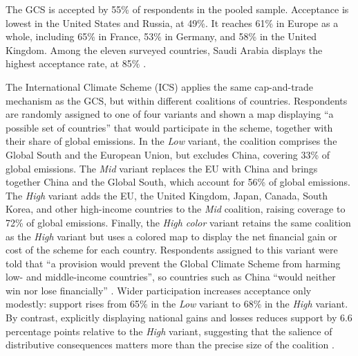 \documentclass[11pt,a4paper]{article}
\begin{document}
The GCS is accepted by 55\% of respondents in the pooled sample. Acceptance is lowest in the United States and Russia, at 49\%. It reaches 61\% in Europe as a whole, including 65\% in France, 53\% in Germany, and 58\% in the United Kingdom. Among the eleven surveyed countries, Saudi Arabia displays the highest acceptance rate, at 85\% \citep[Figures 6 \& S30]{fabre_public_2026}.



The International Climate Scheme (ICS) applies the same cap-and-trade mechanism as the GCS, but within different coalitions of countries. Respondents are randomly assigned to one of four variants and shown a map displaying ``a possible set of countries'' that would participate in the scheme, together with their share of global emissions. In the \textit{Low} variant, the coalition comprises the Global South and the European Union, but excludes China, covering 33\% of global emissions. The \textit{Mid} variant replaces the EU with China and brings together China and the Global South, which account for 56\% of global emissions. The \textit{High} variant adds the EU, the United Kingdom, Japan, Canada, South Korea, and other high-income countries to the \textit{Mid} coalition, raising coverage to 72\% of global emissions. Finally, the \textit{High color} variant retains the same coalition as the \textit{High} variant but uses a colored map to display the net financial gain or cost of the scheme for each country. Respondents assigned to this variant were told that ``a provision would prevent the Global Climate Scheme from harming low- and middle-income countries'', so countries such as China ``would neither win nor lose financially'' \citep[Questions 31--35 and Figure 5]{fabre_public_2026}. Wider participation increases acceptance only modestly: support rises from 65\% in the \textit{Low} variant to 68\% in the \textit{High} variant. By contrast, explicitly displaying national gains and losses reduces support by 6.6 percentage points relative to the \textit{High} variant, suggesting that the salience of distributive consequences matters more than the precise size of the coalition \citep[Figure 6]{fabre_public_2026}.
\end{document}
